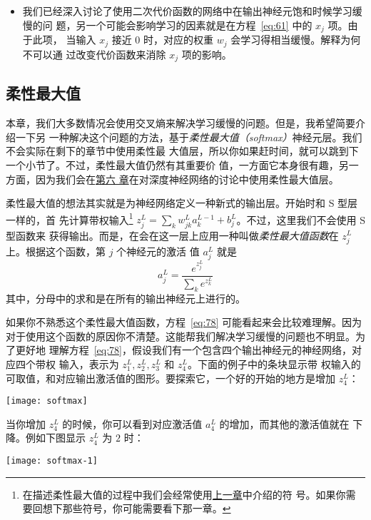 \begin{itemize}
\item 我们已经深入讨论了使用二次代价函数的网络中在输出神经元饱和时候学习缓慢的问
  题，另一个可能会影响学习的因素就是在方程~\eqref{eq:61} 中的 $x_j$ 项。由于此项，
  当输入 $x_j$ 接近 $0$ 时，对应的权重 $w_j$ 会学习得相当缓慢。解释为何不可以通
  过改变代价函数来消除 $x_j$ 项的影响。
\end{itemize}

\subsection{柔性最大值}
\label{subsec:softmax}

本章，我们大多数情况会使用交叉熵来解决学习缓慢的问题。但是，我希望简要介绍一下另
一种解决这个问题的方法，基于\emph{柔性最大值（softmax）}神经元层。我们不会实际在剩下的章节中使用柔性最
大值层，所以你如果赶时间，就可以跳到下一个小节了。不过，柔性最大值仍然有其重要价
值，一方面它本身很有趣，另一方面，因为我们会在\hyperref[ch:Deeplearning]{第六
  章}在对深度神经网络的讨论中使用柔性最大值层。

柔性最大值的想法其实就是为神经网络定义一种新式的输出层。开始时和 S 型层一样的，首
先计算带权输入\footnote{在描述柔性最大值的过程中我们会经常使用\hyperref[ch:HowTheBackpropagationAlgorithmWorks]{上一章}中介绍的符
  号。如果你需要回想下那些符号，你可能需要看下那一章。}
$z^L_j = \sum_{k} w^L_{jk} a^{L-1}_k + b^L_j$。不过，这里我们不会使用 S 型函数来
获得输出。而是，在会在这一层上应用一种叫做\emph{柔性最大值函数}在 $z^L_j$ 上。根据这个函数，第 $j$ 个神经元的激活
值 $a^L_j$ 就是
\begin{equation}
  a^L_j = \frac{e^{z^L_j}}{\sum_k e^{z^L_k}}
  \label{eq:78}\tag{78}
\end{equation}
其中，分母中的求和是在所有的输出神经元上进行的。

如果你不熟悉这个柔性最大值函数，方程~\eqref{eq:78} 可能看起来会比较难理解。因为
对于使用这个函数的原因你不清楚。这能帮我们解决学习缓慢的问题也不明显。为了更好地
理解方程~\eqref{eq:78}，假设我们有一个包含四个输出神经元的神经网络，对应四个带权
输入，表示为 $z^L_1, z^L_2, z^L_3$ 和 $z^L_4$。下面的例子中的条块显示带
权输入的可取值，和对应输出激活值的图形。要探索它，一个好的开始的地方是增加 $z^L_4$：
\begin{center}
  \texttt{[image: softmax]}
\end{center}

当你增加 $z^L_4$ 的时候，你可以看到对应激活值 $a^L_4$ 的增加，而其他的激活值就在
下降。例如下图显示 $z^L_4$ 为 $2$ 时：
\begin{center}
  \texttt{[image: softmax-1]}
\end{center}

